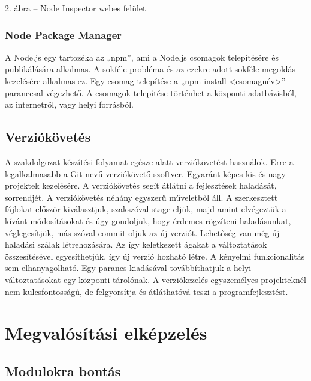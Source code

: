 \documentclass[]{article}
\begin{document}
2. ábra -- Node Inspector webes felület

\hypertarget{node-package-manager}{%
\subsubsection{Node Package Manager}\label{node-package-manager}}

A Node.js egy tartozéka az „npm'', ami a Node.js csomagok telepítésére
és publikálására alkalmas. A sokféle probléma és az ezekre adott sokféle
megoldás kezelésére alkalmas ez. Egy csomag telepítése a „npm install
\textless{}csomagnév\textgreater{}'' paranccsal végezhető. A csomagok
telepítése történhet a központi adatbázisból, az internetről, vagy helyi
forrásból.

\hypertarget{verziuxf3kuxf6vetuxe9s}{%
\subsection{Verziókövetés}\label{verziuxf3kuxf6vetuxe9s}}

A szakdolgozat készítési folyamat egésze alatt verziókövetést használok.
Erre a legalkalmasabb a Git nevű verziókövető szoftver. Egyaránt képes
kis és nagy projektek kezelésére. A verziókövetés segít átlátni a
fejlesztések haladását, sorrendjét. A verziókövetés néhány egyszerű
műveletből áll. A szerkesztett fájlokat először kiválasztjuk, szakszóval
stage-eljük, majd amint elvégeztük a kívánt módosításokat és úgy
gondoljuk, hogy érdemes rögzíteni haladásunkat, véglegesítjük, más
szóval commit-oljuk az új verziót. Lehetőség van még új haladási szálak
létrehozására. Az így keletkezett ágakat a változtatások összesítésével
egyesíthetjük, így új verzió hozható létre. A kényelmi funkcionalitás
sem elhanyagolható. Egy parancs kiadásával továbbíthatjuk a helyi
változtatásokat egy központi tárolónak. A verziókezelés egyszemélyes
projekteknél nem kulcsfontosságú, de felgyorsítja és átláthatóvá teszi a
programfejlesztést.

\hypertarget{megvaluxf3suxedtuxe1si-elkuxe9pzeluxe9s}{%
\section{Megvalósítási
elképzelés}\label{megvaluxf3suxedtuxe1si-elkuxe9pzeluxe9s}}

\hypertarget{modulokra-bontuxe1s}{%
\subsection{Modulokra bontás }\label{modulokra-bontuxe1s}}
\end{document}
